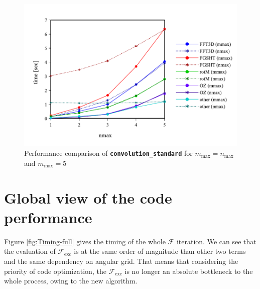 \begin{figure}[H]
\begin{centering}
\includegraphics[bb=0bp 20bp 639bp 268bp,width=1\columnwidth]{_figure/results/nmax}
\par\end{centering}
\caption[Performance comparison of ``convolution\_standard'' for $m_{\max}=n_{\max}$
and $m_{\max}=5$]{Performance comparison of \texttt{\textbf{convolution\_standard}}
for $m_{\max}=n_{\max}$ and $m_{\max}=5$\label{fig:comparison-nmax}}
\end{figure}


\section{Global view of the code performance}

Figure \ref{fig:Timing-full} gives the timing of the whole $\mathcal{F}$
iteration. We can see that the evaluation of $\mathcal{F}_{\mathrm{exc}}$
is at the same order of magnitude than other two terms and the same
dependency on angular grid. That means that considering the priority
of code optimization, the $\mathcal{F}_{\mathrm{exc}}$ is no longer
an absolute bottleneck to the whole process, owing to the new algorithm.

